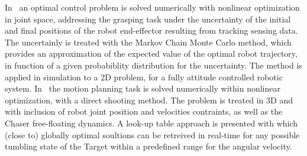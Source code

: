 In~\cite{flores2013optimal} an optimal control problem is solved numerically with nonlinear optimization in joint space, addressing the grasping task under the uncertainty of the initial and final positions of the robot end-effector resulting from tracking sensing data. The uncertainly is treated with the Markov Chain Monte Carlo method, which provides an approximation of the expected value of the optimal robot trajectory, in function of a given probabiblity distribution for the uncertainty. The method is applied in simulation to a 2D problem, for a fully attitude controlled robotic system. In~\cite{lampariello2013generating} the motion planning task is solved numerically within nonlinear optimization, with a direct shooting method. The problem is treated in 3D and with inclusion of robot joint position and velocities contraints, as well as the Chaser free-floating dynamics. A look-up table approach is presented with which (close to) globally optimal soultions can be retreived in real-time for any possible tumbling state of the Target within a predefined range for the angular velocity. 
%


